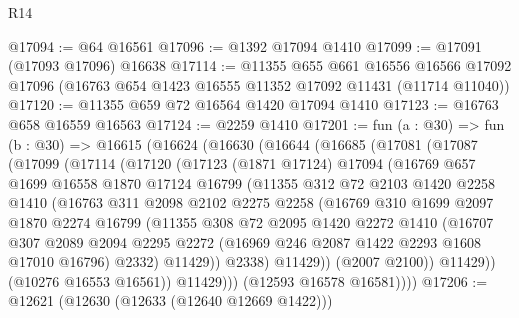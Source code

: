 \begin{lexlean}{R14}
\begin{coremodule}
@17094 := @64 @16561
@17096 := @1392 @17094 @1410
@17099 := @17091 (@17093 @17096) @16638
@17114 := @11355
    @655
    @661
    @16556
    @16566
    @17092
    @17096
    (@16763 @654 @1423 @16555 @11352 @17092 @11431 (@11714 @11040))
@17120 := @11355 @659 @72 @16564 @1420 @17094 @1410
@17123 := @16763 @658 @16559 @16563
@17124 := @2259 @1410
@17201 := fun (a : @30) =>
  fun (b : @30) =>
  @16615
    (@16624
      (@16630
        (@16644
          (@16685
            (@17081
              (@17087
                (@17099
                  (@17114
                    (@17120
                      (@17123
                        (@1871 @17124)
                        @17094
                        (@16769
                          @657
                          @1699
                          @16558
                          @1870
                          @17124
                          @16799
                          (@11355
                            @312
                            @72
                            @2103
                            @1420
                            @2258
                            @1410
                            (@16763
                              @311
                              @2098
                              @2102
                              @2275
                              @2258
                              (@16769
                                @310
                                @1699
                                @2097
                                @1870
                                @2274
                                @16799
                                (@11355
                                  @308
                                  @72
                                  @2095
                                  @1420
                                  @2272
                                  @1410
                                  (@16707
                                    @307
                                    @2089
                                    @2094
                                    @2295
                                    @2272
                                    (@16969 @246 @2087 @1422 @2293 @1608 @17010 @16796)
                                    @2332)
                                  @11429))
                              @2338)
                            @11429))
                        (@2007 @2100))
                      @11429))
                  (@10276 @16553 @16561))
                @11429)))
          (@12593 @16578 @16581))))
@17206 := @12621 (@12630 (@12633 (@12640 @12669 @1422)))

\end{coremodule}
\end{lexlean}
